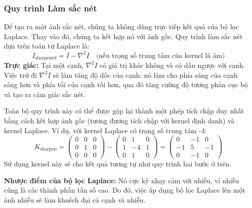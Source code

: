 \subsubsection{Quy trình Làm sắc nét}
\label{subsubsec:sharpening_process}
Để tạo ra một ảnh sắc nét, chúng ta không dùng trực tiếp kết quả của bộ lọc Laplace. Thay vào đó, chúng ta kết hợp nó với ảnh gốc. Quy trình làm sắc nét dựa trên toán tử Laplace là:
\begin{equation}
    I_{\text{sharpened}} = I - \nabla^2 I \quad \text{(nếu trọng số trung tâm của kernel là âm)}
    \label{eq:laplacian_sharpening}
\end{equation}
\textbf{Trực giác:} Tại một cạnh, $\nabla^2 I$ có giá trị khác không và có dấu ngược với cạnh. Việc trừ đi $\nabla^2 I$ sẽ làm tăng độ dốc của cạnh: nó làm cho phía sáng của cạnh sáng hơn và phía tối của cạnh tối hơn, qua đó tăng cường độ tương phản cục bộ và tạo ra cảm giác sắc nét.

Toàn bộ quy trình này có thể được gộp lại thành một phép tích chập duy nhất bằng cách kết hợp ảnh gốc (tương đương tích chập với kernel định danh) và kernel Laplace. Ví dụ, với kernel Laplace có trọng số trung tâm -4:
\begin{equation}
    K_{\text{sharpen}} = \begin{pmatrix} 0 & 0 & 0 \\ 0 & 1 & 0 \\ 0 & 0 & 0 \end{pmatrix} - \begin{pmatrix} 0 & 1 & 0 \\ 1 & -4 & 1 \\ 0 & 1 & 0 \end{pmatrix} = \begin{pmatrix} 0 & -1 & 0 \\ -1 & 5 & -1 \\ 0 & -1 & 0 \end{pmatrix}
\end{equation}
Sử dụng kernel này sẽ cho kết quả tương tự như quy trình hai bước ở trên.

\textbf{Nhược điểm của bộ lọc Laplace:} Nó cực kỳ nhạy cảm với nhiễu, vì nhiễu cũng là các thành phần tần số cao. Do đó, việc áp dụng bộ lọc Laplace lên một ảnh nhiễu sẽ làm khuếch đại cả cạnh và nhiễu.

